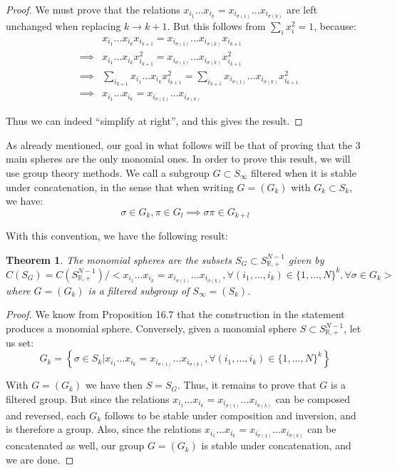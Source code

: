 \documentclass[12pt]{amsbook}
\newtheorem{theorem}{Theorem}[chapter]
\begin{document}
\begin{proof}
We must prove that the relations $x_{i_1}\ldots x_{i_k}=x_{i_{\sigma(1)}}\ldots x_{i_{\sigma(k)}}$ are left unchanged when replacing $k\to k+1$. But this follows from $\sum_ix_i^2=1$, because:
\begin{eqnarray*}
&&x_{i_1}\ldots x_{i_k}x_{i_{k+1}}=x_{i_{\sigma(1)}}\ldots x_{i_{\sigma(k)}}x_{i_{k+1}}\\
&\implies&x_{i_1}\ldots x_{i_k}x_{i_{k+1}}^2=x_{i_{\sigma(1)}}\ldots x_{i_{\sigma(k)}}x_{i_{k+1}}^2\\
&\implies&\sum_{i_{k+1}}x_{i_1}\ldots x_{i_k}x_{i_{k+1}}^2=\sum_{i_{k+1}}x_{i_{\sigma(1)}}\ldots x_{i_{\sigma(k)}}x_{i_{k+1}}^2\\
&\implies&x_{i_1}\ldots x_{i_k}=x_{i_{\sigma(1)}}\ldots x_{i_{\sigma(k)}}
\end{eqnarray*}

Thus we can indeed ``simplify at right'', and this gives the result.
\end{proof}

As already mentioned, our goal in what follows will be that of proving that the 3 main spheres are the only monomial ones. In order to prove this result, we will use group theory methods. We call a subgroup $G\subset S_\infty$ filtered when it is stable under concatenation, in the sense that when writing $G=(G_k)$ with $G_k\subset S_k$, we have:
$$\sigma\in G_k,\pi\in G_l\implies \sigma\pi\in G_{k+l}$$

With this convention, we have the following result:


\begin{theorem}
The monomial spheres are the subsets $S_G\subset S^{N-1}_{\mathbb R,+}$ given by
$$C(S_G)=C(S^{N-1}_{\mathbb R,+})\Big/\Big<x_{i_1}\ldots x_{i_k}=x_{i_{\sigma(1)}}\ldots x_{i_{\sigma(k)}},\forall (i_1,\ldots,i_k)\in\{1,\ldots,N\}^k,\forall\sigma\in G_k\Big>$$
where $G=(G_k)$ is a filtered subgroup of $S_\infty=(S_k)$.
\end{theorem}

\begin{proof}
We know from Proposition 16.7 that the construction in the statement produces a monomial sphere. Conversely, given a monomial sphere $S\subset S^{N-1}_{\mathbb R,+}$, let us set:
$$G_k=\left\{\sigma\in S_k\Big|x_{i_1}\ldots x_{i_k}=x_{i_{\sigma(1)}}\ldots x_{i_{\sigma(k)}},\forall (i_1,\ldots,i_k)\in\{1,\ldots,N\}^k\right\}$$

With $G=(G_k)$ we have then $S=S_G$. Thus, it remains to prove that $G$ is a filtered group. But since the relations $x_{i_1}\ldots x_{i_k}=x_{i_{\sigma(1)}}\ldots x_{i_{\sigma(k)}}$ can be composed and reversed, each $G_k$ follows to be stable under composition and inversion, and is therefore a group. Also, since the relations $x_{i_1}\ldots x_{i_k}=x_{i_{\sigma(1)}}\ldots x_{i_{\sigma(k)}}$ can be concatenated as well, our group $G=(G_k)$ is stable under concatenation, and we are done. 
\end{proof}
\end{document}
